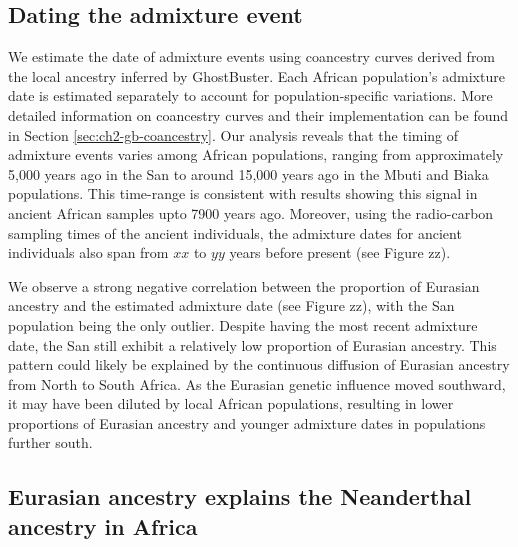 \subsection{Dating the admixture event}

We estimate the date of admixture events using coancestry curves derived from the local ancestry inferred by GhostBuster. Each African population's admixture date is estimated separately to account for population-specific variations. More detailed information on coancestry curves and their implementation can be found in Section \ref{sec:ch2-gb-coancestry}. Our analysis reveals that the timing of admixture events varies among African populations, ranging from approximately 5,000 years ago in the San to around 15,000 years ago in the Mbuti and Biaka populations. This time-range is consistent with results showing this signal in ancient African samples upto 7900 years ago. Moreover, using the radio-carbon sampling times of the ancient individuals, the admixture dates for ancient individuals also span from $xx$ to $yy$ years before present (see Figure zz).

We observe a strong negative correlation between the proportion of Eurasian ancestry and the estimated admixture date (see Figure zz), with the San population being the only outlier. Despite having the most recent admixture date, the San still exhibit a relatively low proportion of Eurasian ancestry. This pattern could likely be explained by the continuous diffusion of Eurasian ancestry from North to South Africa. As the Eurasian genetic influence moved southward, it may have been diluted by local African populations, resulting in lower proportions of Eurasian ancestry and younger admixture dates in populations further south.


\subsection{Eurasian ancestry explains the Neanderthal ancestry in Africa}

